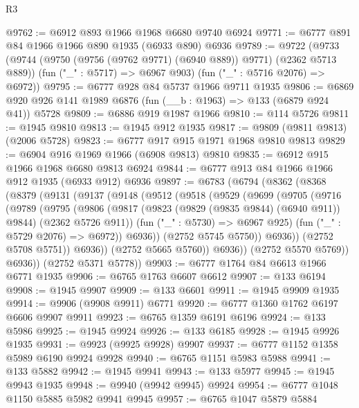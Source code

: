 \begin{lexlean}{R3}
\begin{coremodule}
@9762 := @6912 @893 @1966 @1968 @6680 @9740 @6924
@9771 := @6777 @891 @84 @1966 @1966 @890 @1935 (@6933 @890) @6936
@9789 := @9722
    (@9733
      (@9744 (@9750 (@9756 (@9762 @9771) (@6940 @889)) @9771) (@2362 @5713 @889))
      (fun ("_" : @5717) => @6967 @903)
      (fun ("_" : @5716 @2076) => @6972))
@9795 := @6777 @928 @84 @5737 @1966 @9711 @1935
@9806 := @6869 @920 @926 @141 @1989 @6876 (fun (__b : @1963) => @133 (@6879 @924 @41)) @5728
@9809 := @6886 @919 @1987 @1966
@9810 := @114 @5726
@9811 := @1945 @9810
@9813 := @1945 @912 @1935
@9817 := @9809 (@9811 @9813) (@2006 @5728)
@9823 := @6777 @917 @915 @1971 @1968 @9810 @9813
@9829 := @6904 @916 @1969 @1966 (@6908 @9813) @9810
@9835 := @6912 @915 @1966 @1968 @6680 @9813 @6924
@9844 := @6777 @913 @84 @1966 @1966 @912 @1935 (@6933 @912) @6936
@9897 := @6783
    (@6794
      (@8362
        (@8368
          (@8379
            (@9131
              (@9137
                (@9148
                  (@9512
                    (@9518
                      (@9529
                        (@9699
                          (@9705
                            (@9716
                              (@9789
                                (@9795
                                  (@9806
                                    (@9817
                                      (@9823 (@9829 (@9835 @9844) (@6940 @911)) @9844)
                                      (@2362 @5726 @911))
                                    (fun ("_" : @5730) => @6967 @925)
                                    (fun ("_" : @5729 @2076) => @6972))
                                  @6936))
                              (@2752 @5745 @5750))
                            @6936))
                        (@2752 @5708 @5751))
                      @6936))
                  (@2752 @5665 @5760))
                @6936))
            (@2752 @5570 @5769))
          @6936))
      (@2752 @5371 @5778))
@9903 := @6777 @1764 @84 @6613 @1966 @6771 @1935
@9906 := @6765 @1763 @6607 @6612
@9907 := @133 @6194
@9908 := @1945 @9907
@9909 := @133 @6601
@9911 := @1945 @9909 @1935
@9914 := @9906 (@9908 @9911) @6771
@9920 := @6777 @1360 @1762 @6197 @6606 @9907 @9911
@9923 := @6765 @1359 @6191 @6196
@9924 := @133 @5986
@9925 := @1945 @9924
@9926 := @133 @6185
@9928 := @1945 @9926 @1935
@9931 := @9923 (@9925 @9928) @9907
@9937 := @6777 @1152 @1358 @5989 @6190 @9924 @9928
@9940 := @6765 @1151 @5983 @5988
@9941 := @133 @5882
@9942 := @1945 @9941
@9943 := @133 @5977
@9945 := @1945 @9943 @1935
@9948 := @9940 (@9942 @9945) @9924
@9954 := @6777 @1048 @1150 @5885 @5982 @9941 @9945
@9957 := @6765 @1047 @5879 @5884

\end{coremodule}
\end{lexlean}
